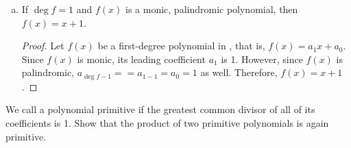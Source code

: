 \begin{enumerate}[(a)]
\begin{proof}
          It follows that each term cancels its palindromic term, and the resulting sum is 0.
        \end{proof}
  \item If $\deg f = 1$ and $f(x)$ is a monic, palindromic polynomial, then $f(x) = x+1$.
        \begin{proof}
          Let $f(x)$ be a first-degree polynomial in \C, that is, $f(x) = a_1x + a_0$.
          Since $f(x)$ is monic, its leading coefficient $a_1$ is 1.
          However, since $f(x)$ is palindromic, $a_{\deg f - 1} = = a_{1-1} = a_0 = 1$ as well.
          Therefore, $f(x) = x + 1$.
        \end{proof}
\end{enumerate}



\question We call a polynomial primitive if the greatest common divisor of all of its coefficients is 1.
Show that the product of two primitive polynomials is again primitive.

